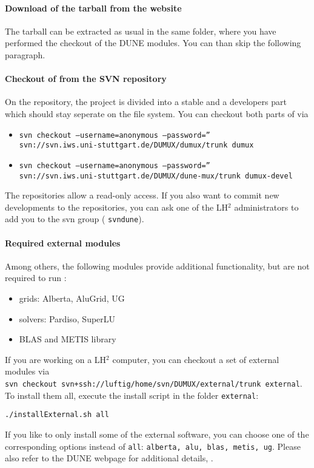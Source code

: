 \paragraph{Download of the \Dumux tarball from the website}
The \Dumux tarball can be extracted as usual in the same folder, where you have performed the checkout of the DUNE modules. You can than skip the following paragraph.

\paragraph{Checkout of \Dumux from the SVN repository} 
On the repository, the \Dumux project is divided into a stable and a developers part which should stay seperate
on the file system. You can checkout both parts of \Dumux via 
\begin{itemize}
 \item \texttt{svn checkout --username=anonymous --password='' \\ 
      \hspace{2cm} svn://svn.iws.uni-stuttgart.de/DUMUX/dumux/trunk dumux}
 \item \texttt{svn checkout --username=anonymous --password='' \\
      \hspace{2cm} svn://svn.iws.uni-stuttgart.de/DUMUX/dune-mux/trunk dumux-devel}
\end{itemize} 
The repositories allow a read-only access. If you also want to commit new developments to the repositories, you can ask one of the LH$^2$ administrators to add you to the svn group ( \texttt{svndune}).

\paragraph{Required external modules}
Among others, the following modules provide additional functionality, but are not required to run \Dumux:
\begin{itemize}
 \item grids: Alberta, AluGrid, UG
 \item solvers: Pardiso, SuperLU
 \item BLAS and METIS library 
\end{itemize}
If you are working on a LH$^2$ computer, you can checkout a set of external modules via \\
\texttt{svn checkout svn+ssh://luftig/home/svn/DUMUX/external/trunk external}. \\
To install them all, execute the install script in the folder \texttt{external}:
\begin{center}
\texttt{./installExternal.sh all}
\end{center}
If you like to only install some of the external software, you can choose one of the 
corresponding options instead of \texttt{all}: \texttt{alberta, alu, blas, metis, ug}.
Please also refer to the DUNE webpage for additional details, \cite{DUNE-HP}. 



